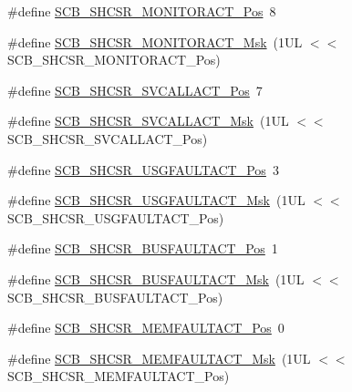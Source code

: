 \begin{DoxyCompactItemize}
\item 
\#define \hyperlink{group___c_m_s_i_s___s_c_b_ga8b71cf4c61803752a41c96deb00d26af}{S\+C\+B\+\_\+\+S\+H\+C\+S\+R\+\_\+\+M\+O\+N\+I\+T\+O\+R\+A\+C\+T\+\_\+\+Pos}~8
\item 
\#define \hyperlink{group___c_m_s_i_s___s_c_b_gaad09b4bc36e9bccccc2e110d20b16e1a}{S\+C\+B\+\_\+\+S\+H\+C\+S\+R\+\_\+\+M\+O\+N\+I\+T\+O\+R\+A\+C\+T\+\_\+\+Msk}~(1\+U\+L $<$$<$ S\+C\+B\+\_\+\+S\+H\+C\+S\+R\+\_\+\+M\+O\+N\+I\+T\+O\+R\+A\+C\+T\+\_\+\+Pos)
\item 
\#define \hyperlink{group___c_m_s_i_s___s_c_b_ga977f5176be2bc8b123873861b38bc02f}{S\+C\+B\+\_\+\+S\+H\+C\+S\+R\+\_\+\+S\+V\+C\+A\+L\+L\+A\+C\+T\+\_\+\+Pos}~7
\item 
\#define \hyperlink{group___c_m_s_i_s___s_c_b_ga634c0f69a233475289023ae5cb158fdf}{S\+C\+B\+\_\+\+S\+H\+C\+S\+R\+\_\+\+S\+V\+C\+A\+L\+L\+A\+C\+T\+\_\+\+Msk}~(1\+U\+L $<$$<$ S\+C\+B\+\_\+\+S\+H\+C\+S\+R\+\_\+\+S\+V\+C\+A\+L\+L\+A\+C\+T\+\_\+\+Pos)
\item 
\#define \hyperlink{group___c_m_s_i_s___s_c_b_gae06f54f5081f01ed3f6824e451ad3656}{S\+C\+B\+\_\+\+S\+H\+C\+S\+R\+\_\+\+U\+S\+G\+F\+A\+U\+L\+T\+A\+C\+T\+\_\+\+Pos}~3
\item 
\#define \hyperlink{group___c_m_s_i_s___s_c_b_gab3166103b5a5f7931d0df90949c47dfe}{S\+C\+B\+\_\+\+S\+H\+C\+S\+R\+\_\+\+U\+S\+G\+F\+A\+U\+L\+T\+A\+C\+T\+\_\+\+Msk}~(1\+U\+L $<$$<$ S\+C\+B\+\_\+\+S\+H\+C\+S\+R\+\_\+\+U\+S\+G\+F\+A\+U\+L\+T\+A\+C\+T\+\_\+\+Pos)
\item 
\#define \hyperlink{group___c_m_s_i_s___s_c_b_gaf272760f2df9ecdd8a5fbbd65c0b767a}{S\+C\+B\+\_\+\+S\+H\+C\+S\+R\+\_\+\+B\+U\+S\+F\+A\+U\+L\+T\+A\+C\+T\+\_\+\+Pos}~1
\item 
\#define \hyperlink{group___c_m_s_i_s___s_c_b_ga9d7a8b1054b655ad08d85c3c535d4f73}{S\+C\+B\+\_\+\+S\+H\+C\+S\+R\+\_\+\+B\+U\+S\+F\+A\+U\+L\+T\+A\+C\+T\+\_\+\+Msk}~(1\+U\+L $<$$<$ S\+C\+B\+\_\+\+S\+H\+C\+S\+R\+\_\+\+B\+U\+S\+F\+A\+U\+L\+T\+A\+C\+T\+\_\+\+Pos)
\item 
\#define \hyperlink{group___c_m_s_i_s___s_c_b_ga7c856f79a75dcc1d1517b19a67691803}{S\+C\+B\+\_\+\+S\+H\+C\+S\+R\+\_\+\+M\+E\+M\+F\+A\+U\+L\+T\+A\+C\+T\+\_\+\+Pos}~0
\item 
\#define \hyperlink{group___c_m_s_i_s___s_c_b_ga9147fd4e1b12394ae26eadf900a023a3}{S\+C\+B\+\_\+\+S\+H\+C\+S\+R\+\_\+\+M\+E\+M\+F\+A\+U\+L\+T\+A\+C\+T\+\_\+\+Msk}~(1\+U\+L $<$$<$ S\+C\+B\+\_\+\+S\+H\+C\+S\+R\+\_\+\+M\+E\+M\+F\+A\+U\+L\+T\+A\+C\+T\+\_\+\+Pos)
\item 
$$
\end{DoxyCompactItemize}
